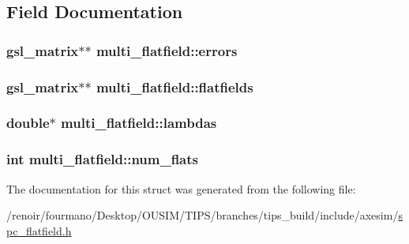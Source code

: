 \subsection{Field Documentation}
\hypertarget{structmulti__flatfield_a524bb3759060a0ac556ab8d6b1e0f146}{
\subsubsection[{errors}]{\setlength{\rightskip}{0pt plus 5cm}gsl\_\-matrix$\ast$$\ast$ {\bf multi\_\-flatfield::errors}}}
\label{structmulti__flatfield_a524bb3759060a0ac556ab8d6b1e0f146}
\hypertarget{structmulti__flatfield_ac18df4cfe74dac5ef4ae036ffc24bddd}{
\subsubsection[{flatfields}]{\setlength{\rightskip}{0pt plus 5cm}gsl\_\-matrix$\ast$$\ast$ {\bf multi\_\-flatfield::flatfields}}}
\label{structmulti__flatfield_ac18df4cfe74dac5ef4ae036ffc24bddd}
\hypertarget{structmulti__flatfield_a174bf56a945c6149cb95ba3bcc2fcea7}{
\subsubsection[{lambdas}]{\setlength{\rightskip}{0pt plus 5cm}double$\ast$ {\bf multi\_\-flatfield::lambdas}}}
\label{structmulti__flatfield_a174bf56a945c6149cb95ba3bcc2fcea7}
\hypertarget{structmulti__flatfield_a1445b447b76505577b98dead719a86b7}{
\subsubsection[{num\_\-flats}]{\setlength{\rightskip}{0pt plus 5cm}int {\bf multi\_\-flatfield::num\_\-flats}}}
\label{structmulti__flatfield_a1445b447b76505577b98dead719a86b7}


The documentation for this struct was generated from the following file:\begin{DoxyCompactItemize}
\item 
/renoir/fourmano/Desktop/OUSIM/TIPS/branches/tips\_\-build/include/axesim/\hyperlink{spc__flatfield_8h}{spc\_\-flatfield.h}\end{DoxyCompactItemize}
